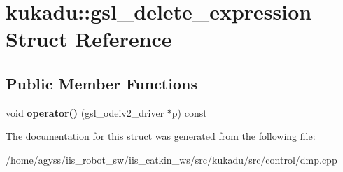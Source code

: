 \hypertarget{structkukadu_1_1gsl__delete__expression}{}\section{kukadu\+:\+:gsl\+\_\+delete\+\_\+expression Struct Reference}
\label{structkukadu_1_1gsl__delete__expression}
\subsection*{Public Member Functions}
\begin{DoxyCompactItemize}
\item 
void {\bfseries operator()} (gsl\+\_\+odeiv2\+\_\+driver $\ast$p) const \hypertarget{structkukadu_1_1gsl__delete__expression_a2eef07907659d92f2165f0584fa59c81}{}\label{structkukadu_1_1gsl__delete__expression_a2eef07907659d92f2165f0584fa59c81}

\end{DoxyCompactItemize}


The documentation for this struct was generated from the following file\+:\begin{DoxyCompactItemize}
\item 
/home/agyss/iis\+\_\+robot\+\_\+sw/iis\+\_\+catkin\+\_\+ws/src/kukadu/src/control/dmp.\+cpp\end{DoxyCompactItemize}
